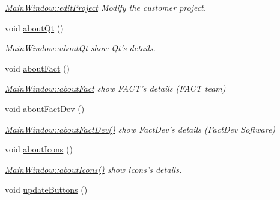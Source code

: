 \begin{DoxyCompactItemize}
\begin{DoxyCompactList}\small\item\em \hyperlink{classGui_1_1MainWindow_a80af8e18d89a51a3368a65fb22e02040}{Main\-Window\-::edit\-Project} Modify the customer project. \end{DoxyCompactList}\item 
\hypertarget{classGui_1_1MainWindow_a6df8072789ea8ec81ca2dd8fa78a4b01}{void \hyperlink{classGui_1_1MainWindow_a6df8072789ea8ec81ca2dd8fa78a4b01}{about\-Qt} ()}\label{classGui_1_1MainWindow_a6df8072789ea8ec81ca2dd8fa78a4b01}

\begin{DoxyCompactList}\small\item\em \hyperlink{classGui_1_1MainWindow_a6df8072789ea8ec81ca2dd8fa78a4b01}{Main\-Window\-::about\-Qt} show Qt's details. \end{DoxyCompactList}\item 
\hypertarget{classGui_1_1MainWindow_a26726203b873f41f607d78c5d5619c7d}{void \hyperlink{classGui_1_1MainWindow_a26726203b873f41f607d78c5d5619c7d}{about\-Fact} ()}\label{classGui_1_1MainWindow_a26726203b873f41f607d78c5d5619c7d}

\begin{DoxyCompactList}\small\item\em \hyperlink{classGui_1_1MainWindow_a26726203b873f41f607d78c5d5619c7d}{Main\-Window\-::about\-Fact} show F\-A\-C\-T's details (F\-A\-C\-T team) \end{DoxyCompactList}\item 
\hypertarget{classGui_1_1MainWindow_a39fe49fec47b6cbe4c8664d97bc47e0f}{void \hyperlink{classGui_1_1MainWindow_a39fe49fec47b6cbe4c8664d97bc47e0f}{about\-Fact\-Dev} ()}\label{classGui_1_1MainWindow_a39fe49fec47b6cbe4c8664d97bc47e0f}

\begin{DoxyCompactList}\small\item\em \hyperlink{classGui_1_1MainWindow_a39fe49fec47b6cbe4c8664d97bc47e0f}{Main\-Window\-::about\-Fact\-Dev()} show Fact\-Dev's details (Fact\-Dev Software) \end{DoxyCompactList}\item 
\hypertarget{classGui_1_1MainWindow_a56db09003bd79c8635488d0edc57cdb3}{void \hyperlink{classGui_1_1MainWindow_a56db09003bd79c8635488d0edc57cdb3}{about\-Icons} ()}\label{classGui_1_1MainWindow_a56db09003bd79c8635488d0edc57cdb3}

\begin{DoxyCompactList}\small\item\em \hyperlink{classGui_1_1MainWindow_a56db09003bd79c8635488d0edc57cdb3}{Main\-Window\-::about\-Icons()} show icons's details. \end{DoxyCompactList}\item 
\hypertarget{classGui_1_1MainWindow_aef4e1621cfa50a15b85921215c7171b8}{void \hyperlink{classGui_1_1MainWindow_aef4e1621cfa50a15b85921215c7171b8}{update\-Buttons} ()}\label{classGui_1_1MainWindow_aef4e1621cfa50a15b85921215c7171b8}


\end{DoxyCompactItemize}
